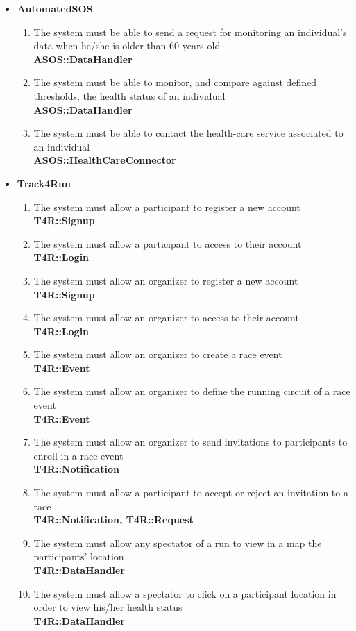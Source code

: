 \documentclass[a4paper, hidelinks, 12pt]{report}
\newcommand\requirement[1]{\item[{[R#1]}] }
\begin{document}
\begin{itemize}
	\item{\textbf{AutomatedSOS}}
	\begin{enumerate}
		\requirement{13} The system must be able to send a request for monitoring an individual's data when he/she is older than 60 years old \\
		\textbf{ASOS::DataHandler}
		\requirement{14} The system must be able to monitor, and compare against defined thresholds, the health status of an individual \\
		\textbf{ASOS::DataHandler}
		\requirement{15} The system must be able to contact the health-care service associated to an individual \\
		\textbf{ASOS::HealthCareConnector}
	\end{enumerate}
	
	\item{\textbf{Track4Run}}
	\begin{enumerate}
		\requirement{16} The system must allow a participant to register a new account \\
		\textbf{T4R::Signup}
		\requirement{17} The system must allow a participant to access to their account \\
		\textbf{T4R::Login}
		\requirement{18} The system must allow an organizer to register a new account \\
		\textbf{T4R::Signup}
		\requirement{19} The system must allow an organizer to access to their account \\
		\textbf{T4R::Login}
		\requirement{20} The system must allow an organizer to create a race event \\ 
		\textbf{T4R::Event}
		\requirement{21} The system must allow an organizer to define the running circuit of a race event \\
		\textbf{T4R::Event}
		\requirement{22} The system must allow an organizer to send invitations to participants to enroll in a race event \\
		\textbf{T4R::Notification}
		\requirement{23} The system must allow a participant to accept or reject an invitation to a race \\
		\textbf{T4R::Notification, T4R::Request}
		\requirement{24} The system must allow any spectator of a run to view in a map the participants' location \\ 
		\textbf{T4R::DataHandler}
		\requirement{25} The system must allow a spectator to click on a participant location in order to view his/her health status \\
		\textbf{T4R::DataHandler}
	\end{enumerate}
\end{itemize}
\end{document}
